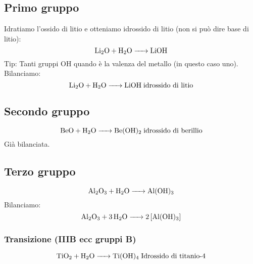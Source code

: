 \subsection{Primo gruppo}
Idratiamo l'ossido di litio e otteniamo idrossido di litio (non si può dire base di litio):
$$\ce{Li_2O + H_2O -> LiOH}$$
Tip: Tanti gruppi OH quando è la valenza del metallo (in questo caso uno). Bilanciamo:
$$\ce{Li_2O + H_2O -> LiOH} \; \text{idrossido di litio}$$
\subsection{Secondo gruppo}
$$\ce{BeO + H_2O -> Be(OH)_2} \; \text{idrossido di berillio}$$
Già bilanciata.
\subsection{Terzo gruppo}
$$\ce{Al_2O_3 + H_2O -> Al(OH)_3}$$
Bilanciamo:
$$\ce{Al_2O_3 + 3 H_2O -> 2 [Al(OH)_3]}$$
\subsubsection{Transizione (IIIB ecc gruppi B)}
$$\ce{TiO_2 + H_2O -> Ti(OH)_4} \; \text{Idrossido di titanio-4}$$